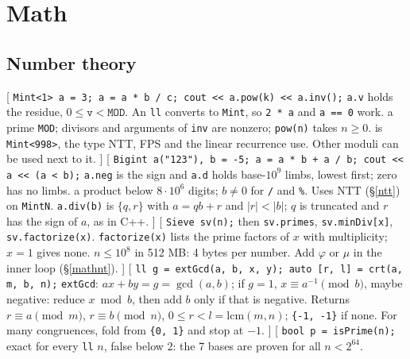 \section{Math}
\threelevels
{}

\subsection{Number theory}
[
	 \texttt{Mint<1> a = 3; a = a * b / c; cout << a.pow(k) << a.inv();}
	 \texttt{a.v} holds the residue, $0 \le \texttt{v} < \texttt{MOD}$. An \texttt{ll} converts to \texttt{Mint}, so \texttt{2 * a} and \texttt{a == 0} work.
	 a prime \texttt{MOD}; divisors and arguments of \texttt{inv} are nonzero; \texttt{pow(n)} takes $n \ge 0$.
	 is \texttt{Mint<998>}, the type NTT, FPS and the linear recurrence use. Other moduli can be used next to it.
]\label{modint}
[
	 \texttt{Bigint a("123"), b = -5; a = a * b + a / b; cout << a << (a < b);}
	 \texttt{a.neg} is the sign and \texttt{a.d} holds base-$10^9$ limbs, lowest first; zero has no limbs.
	 a product below $8 \cdot 10^6$ digits; $b \ne 0$ for \texttt{/} and \texttt{\%}. Uses NTT (\S\ref{ntt}) on \texttt{MintN}.
	 \texttt{a.div(b)} is $\{q, r\}$ with $a = qb + r$ and $|r| < |b|$; $q$ is truncated and $r$ has the sign of $a$, as in C++.
]\label{bigint}
[
	 \texttt{Sieve sv(n);} then \texttt{sv.primes}, \texttt{sv.minDiv[x]}, \texttt{sv.factorize(x)}.
	 \texttt{factorize(x)} lists the prime factors of $x$ with multiplicity; $x = 1$ gives none.
	 $n \le 10^8$ in 512 MB: 4 bytes per number. Add $\varphi$ or $\mu$ in the inner loop (\S\ref{mathnt}).
]\label{sieve}
[
	 \texttt{ll g = extGcd(a, b, x, y); auto [r, l] = crt(a, m, b, n);}
	 \texttt{extGcd}: $ax + by = g = \gcd(a, b)$; if $g = 1$, $x \equiv a^{-1} \pmod b$, maybe negative: reduce $x \bmod b$, then add $b$ only if that is negative.
	 Returns $r \equiv a \pmod m$, $r \equiv b \pmod n$, $0 \le r < l = \mathrm{lcm}(m, n)$; \texttt{\{-1, -1\}} if none.
	\endgraf\noindent For many congruences, fold from \texttt{\{0, 1\}} and stop at $-1$.
]\label{crt}
[
	 \texttt{bool p = isPrime(n);}
	 exact for every \texttt{ll} $n$, false below 2: the 7 bases are proven for all $n < 2^{64}$.

